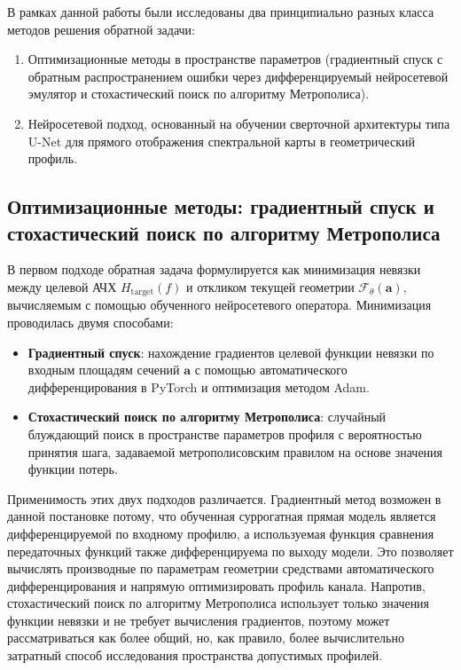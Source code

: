 В рамках данной работы были исследованы два принципиально разных класса методов решения обратной задачи:
\begin{enumerate}
    \item Оптимизационные методы в пространстве параметров (градиентный спуск с обратным распространением ошибки через дифференцируемый нейросетевой эмулятор и стохастический поиск по алгоритму Метрополиса).
    \item Нейросетевой подход, основанный на обучении сверточной архитектуры типа U-Net для прямого отображения спектральной карты в геометрический профиль.
\end{enumerate}

\subsection{Оптимизационные методы: градиентный спуск и стохастический поиск по алгоритму Метрополиса}
\label{subsec:opt_methods}

В первом подходе обратная задача формулируется как минимизация невязки между целевой АЧХ $H_{\mathrm{target}}(f)$ и откликом текущей геометрии $\mathcal{F}_{\theta}(\mathbf{a})$, вычисляемым с помощью обученного нейросетевого оператора. Минимизация проводилась двумя способами:
\begin{itemize}
    \item \textbf{Градиентный спуск}: нахождение градиентов целевой функции невязки по входным площадям сечений $\mathbf{a}$ с помощью автоматического дифференцирования в PyTorch и оптимизация методом Adam.
    \item \textbf{Стохастический поиск по алгоритму Метрополиса}: случайный блуждающий поиск в пространстве параметров профиля с вероятностью принятия шага, задаваемой метрополисовским правилом на основе значения функции потерь.
\end{itemize}

Применимость этих двух подходов различается. Градиентный метод возможен в данной постановке потому, что обученная суррогатная прямая модель является дифференцируемой по входному профилю, а используемая функция сравнения передаточных функций также дифференцируема по выходу модели. Это позволяет вычислять производные по параметрам геометрии средствами автоматического дифференцирования и напрямую оптимизировать профиль канала. Напротив, стохастический поиск по алгоритму Метрополиса использует только значения функции невязки и не требует вычисления градиентов, поэтому может рассматриваться как более общий, но, как правило, более вычислительно затратный способ исследования пространства допустимых профилей.

